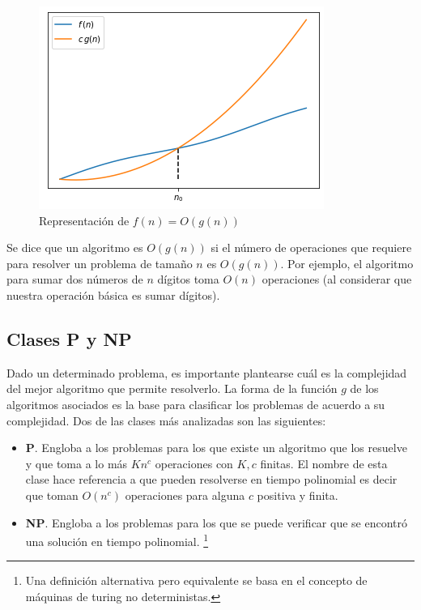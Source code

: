 \begin{figure}[H]
    \centering
    \includegraphics[scale=.8]{Imagenes/bigo.png}
    \caption{Representación de $f(n)= O(g(n))$}
    \label{fig:bigo}
\end{figure}

Se dice que un algoritmo es $O(g(n))$ si el número de operaciones que requiere para resolver un problema de tamaño $n$ es $O(g(n))$.
%
Por ejemplo, el algoritmo para sumar dos números de $n$ dígitos toma $O(n)$ operaciones (al considerar que nuestra operación básica es sumar dígitos).

\subsection*{Clases \textbf{P} y \textbf{NP}}

Dado un determinado problema, es importante plantearse cuál es la complejidad del mejor algoritmo que permite resolverlo.
%
La forma de la función $g$ de los algoritmos asociados es la base para clasificar los problemas de acuerdo a su complejidad.
%
Dos de las clases más analizadas son las siguientes:

\begin{itemize} 
    \item \textbf{P}. Engloba a los problemas para los que existe un algoritmo que los resuelve y que toma a lo más $Kn^c$ operaciones con $K,c$ finitas. 
		El nombre de esta clase hace referencia a que pueden resolverse en tiempo polinomial es decir que toman $O(n^c)$ operaciones para alguna $c$ positiva y finita. 

    \item \textbf{NP}. Engloba a los problemas para los que se puede verificar que se encontró una solución en tiempo polinomial. \footnote{Una definición alternativa pero equivalente se basa en el concepto de máquinas de turing no deterministas.}
\end{itemize}

